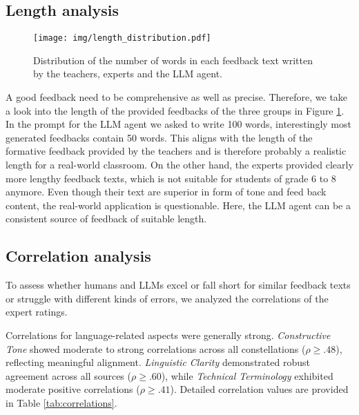 \subsection{Length analysis}\label{sec:length}

\begin{figure}[htbp]
    \centering
    \texttt{[image: img/length\_distribution.pdf]}
    \caption{Distribution of the number of words in each feedback text written by the teachers, experts and the LLM agent.}
    \label{fig:length_distribution}
\end{figure}


A good feedback need to be comprehensive as well as precise. Therefore, we take a look into the length of the provided feedbacks of the three groups in Figure \ref{fig:length_distribution}. In the prompt for the LLM agent we asked to write 100 words, interestingly most generated feedbacks contain 50 words. This aligns with the length of the formative feedback provided by the teachers and is therefore probably a realistic length for a real-world classroom. On the other hand, the experts provided clearly more lengthy feedback texts, which is not suitable for students of grade 6 to 8 anymore. Even though their text are superior in form of tone and feed back content, the real-world application is questionable. Here, the LLM agent can be a consistent source of feedback of suitable length.




\subsection{Correlation analysis}\label{sec:corr_analysis}

To assess whether humans and LLMs excel or fall short for similar feedback texts or struggle with different kinds of errors, we analyzed the correlations of the expert ratings.

Correlations for language-related aspects were generally strong. \textit{Constructive Tone} showed moderate to strong correlations across all constellations ($\rho \geq .48$), reflecting meaningful alignment. \textit{Linguistic Clarity} demonstrated robust agreement across all sources ($\rho \geq .60$), while \textit{Technical Terminology} exhibited moderate positive correlations ($\rho \geq .41$). Detailed correlation values are provided in Table \ref{tab:correlations}.

